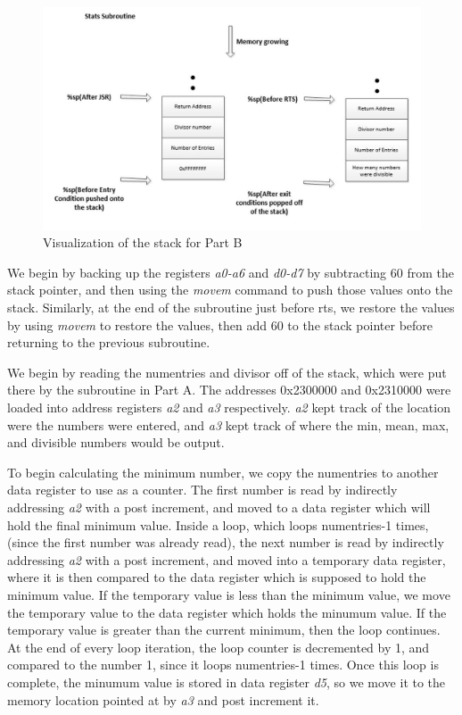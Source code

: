 \documentclass[letterpaper]{article}
\begin{document}
    \begin{figure}[h!]
      \centering
      \includegraphics[width=.8\textwidth]{designb.jpg}
      \caption{Visualization of the stack for Part B}
    \end{figure}

    We begin by backing up the registers \textit{a0-a6} and \textit{d0-d7} by
    subtracting 60 from the stack pointer, and then using the \textit{movem}
    command to push those values onto the stack. Similarly, at the end of the
    subroutine just before rts, we restore the values by using \textit{movem} to restore the values,
    then add 60 to the stack pointer before returning to the previous subroutine.

    We begin by reading the numentries and divisor off of the stack, which
    were put there by the subroutine in Part A. The addresses 0x2300000
    and 0x2310000 were loaded into address registers \textit{a2} and \textit{a3} respectively.
    \textit{a2} kept track of the location were the numbers were entered, and \textit{a3}
    kept track of where the min, mean, max, and divisible numbers would be output.

    To begin calculating the minimum number, we copy the numentries to another
    data register to use as a counter. The first number is read by indirectly addressing
    \textit{a2} with a post increment, and moved to a data register which will hold the
    final minimum value. Inside a loop, which loops numentries-1
    times, (since the first number was already read), the next number is read by indirectly
    addressing \textit{a2} with a post increment, and
    moved into a temporary data register, where it is then compared to the data register
    which is supposed to hold the minimum value. If the temporary value is less than the
    minimum value, we move the temporary value to the data register which holds the minumum value.
    If the temporary value is greater than the current minimum, then the loop continues.
    At the end of every loop iteration, the loop counter is decremented by 1, and compared
    to the number 1, since it loops numentries-1 times. Once this loop is complete,
    the minumum value is stored in data register \textit{d5}, so we move it to
    the memory location pointed at by \textit{a3} and post increment it.
\end{document}
